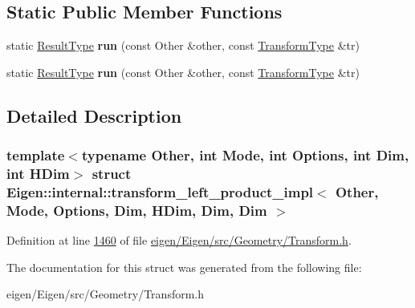 \subsection*{Static Public Member Functions}
\begin{DoxyCompactItemize}
\item 
\mbox{\label{struct_eigen_1_1internal_1_1transform__left__product__impl_3_01_other_00_01_mode_00_01_options_0b0d1bc6bb0265d07cac191ec3dc368a3_a7b510e881e3c785e32c58c0ca07db7db}} 
static \hyperlink{group___geometry___module_class_eigen_1_1_transform}{Result\+Type} {\bfseries run} (const Other \&other, const \hyperlink{group___geometry___module_class_eigen_1_1_transform}{Transform\+Type} \&tr)
\item 
\mbox{\label{struct_eigen_1_1internal_1_1transform__left__product__impl_3_01_other_00_01_mode_00_01_options_0b0d1bc6bb0265d07cac191ec3dc368a3_a7b510e881e3c785e32c58c0ca07db7db}} 
static \hyperlink{group___geometry___module_class_eigen_1_1_transform}{Result\+Type} {\bfseries run} (const Other \&other, const \hyperlink{group___geometry___module_class_eigen_1_1_transform}{Transform\+Type} \&tr)
\end{DoxyCompactItemize}


\subsection{Detailed Description}
\subsubsection*{template$<$typename Other, int Mode, int Options, int Dim, int H\+Dim$>$\newline
struct Eigen\+::internal\+::transform\+\_\+left\+\_\+product\+\_\+impl$<$ Other, Mode, Options, Dim, H\+Dim, Dim, Dim $>$}



Definition at line \hyperlink{eigen_2_eigen_2src_2_geometry_2_transform_8h_source_l01460}{1460} of file \hyperlink{eigen_2_eigen_2src_2_geometry_2_transform_8h_source}{eigen/\+Eigen/src/\+Geometry/\+Transform.\+h}.



The documentation for this struct was generated from the following file\+:\begin{DoxyCompactItemize}
\item 
eigen/\+Eigen/src/\+Geometry/\+Transform.\+h\end{DoxyCompactItemize}
